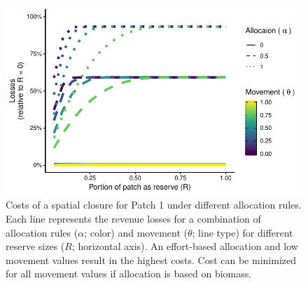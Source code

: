 \documentclass[12pt]{article}
\begin{document}
\begin{figure}[htbp]
\centering
\includegraphics{img/allocation_cost_plot.pdf}
\caption{\label{fig:allocation_cost_plot}Costs of a spatial closure for Patch 1 under different allocation rules. Each line represents the revenue losses for a combination of allocation rules ($\alpha$; color) and movement ($\theta$; line type) for different reserve sizes ($R$; horizontal axis). An effort-based allocation and low movement values result in the highest costs. Cost can be minimized for all movement values if allocation is based on biomass.}
\end{figure}
\end{document}
